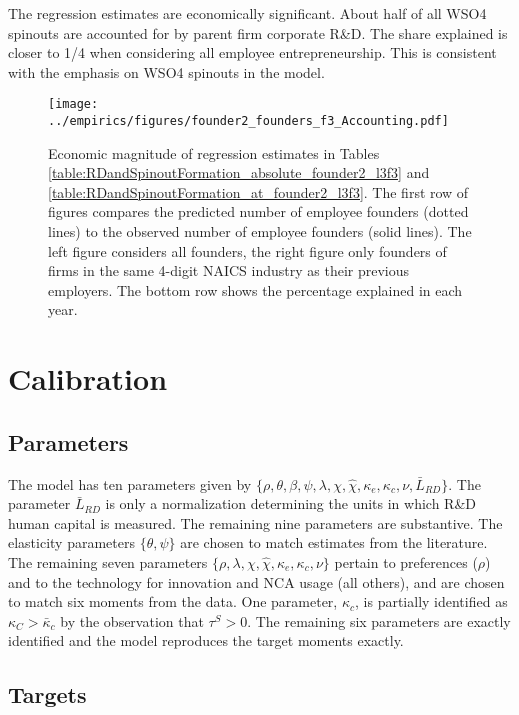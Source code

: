 \documentclass[11pt,english]{article}
\begin{document}
The regression estimates are economically significant. About half of all WSO4 spinouts are accounted for by parent firm corporate R\&D. The share explained is closer to 1/4 when considering all employee entrepreneurship. This is consistent with the emphasis on WSO4 spinouts in the model. 

\begin{figure}[!htb]
	\texttt{[image: ../empirics/figures/founder2\_founders\_f3\_Accounting.pdf]}
	\caption{Economic magnitude of regression estimates in Tables \ref{table:RDandSpinoutFormation_absolute_founder2_l3f3} and \ref{table:RDandSpinoutFormation_at_founder2_l3f3}. The first row of figures compares the predicted number of employee founders (dotted lines) to the observed number of employee founders (solid lines). The left figure considers all founders, the right figure only founders of firms in the same 4-digit NAICS industry as their previous employers. The bottom row shows the percentage explained in each year.}
	\label{figure:founder2_founders_f3_Accounting}
\end{figure}

\section{Calibration}\label{sec:calibration}

\subsection{Parameters}

The model has ten parameters given by $\{\rho, \theta, \beta, \psi, \lambda, \chi, \hat{\chi}, \kappa_e, \kappa_c, \nu, \bar{L}_{RD}\}$. The parameter $\bar{L}_{RD}$ is only a normalization determining the units in which R\&D human capital is measured. The remaining nine parameters are substantive. The elasticity parameters $\{\theta, \psi\}$ are chosen to match estimates from the literature. The remaining seven parameters $\{\rho, \lambda, \chi, \hat{\chi}, \kappa_e, \kappa_c, \nu\}$ pertain to preferences ($\rho$) and to the technology for innovation and NCA usage (all others), and are chosen to match six moments from the data. One parameter, $\kappa_c$, is partially identified as $\kappa_C > \bar{\kappa}_c$ by the observation that $\tau^S > 0$. The remaining six parameters are exactly identified and the model reproduces the target moments exactly. 

\subsection{Targets}
\end{document}

